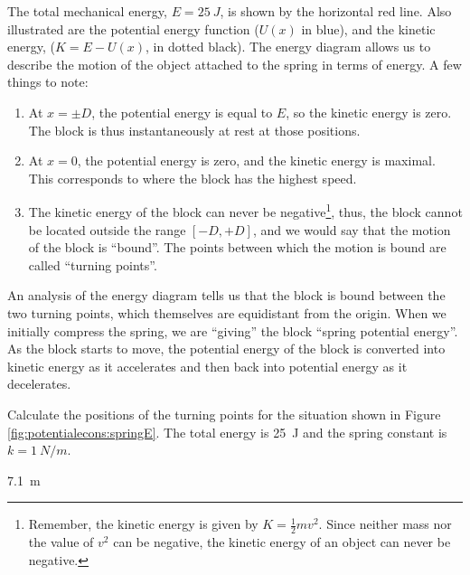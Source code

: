 The total mechanical energy, $E=\SI{25}{J}$, is shown by the horizontal red line. Also illustrated are the potential energy function ($U(x)$ in blue), and the kinetic energy, ($K=E-U(x)$, in dotted black).
The energy diagram allows us to describe the motion of the object attached to the spring in terms of energy. A few things to note:
\begin{enumerate}
\item At $x=\pm D$, the potential energy is equal to $E$, so the kinetic energy is zero. The block is thus instantaneously at rest at those positions.
\item At $x=0$, the potential energy is zero, and the kinetic energy is maximal. This corresponds to where the block has the highest speed. 
\item The kinetic energy of the block can never be negative\footnote{Remember, the kinetic energy is given by $K=\frac{1}{2}mv^2$. Since neither mass nor the value of $v^2$ can be negative, the kinetic energy of an object can never be negative.}, thus, the block cannot be located outside the range $[-D,+D]$, and we would say that the motion of the block is ``bound''. The points between which the motion is bound are called ``turning points''.
\end{enumerate}
An analysis of the energy diagram tells us that the block is bound between the two turning points, which themselves are equidistant from the origin. When we initially compress the spring, we are ``giving'' the block ``spring potential energy''. As the block starts to move, the potential energy of the block is converted into kinetic energy as it accelerates and then back into potential energy as it decelerates.

\begin{checkpoint}
Calculate the positions of the turning points for the situation shown in Figure \ref{fig:potentialecons:springE}. The total energy is \SI{25}{J} and the spring constant is $k=\SI{1}{N/m}$.
\begin{answer}
\SI{7.1}{m}
\end{answer}
\end{checkpoint}

